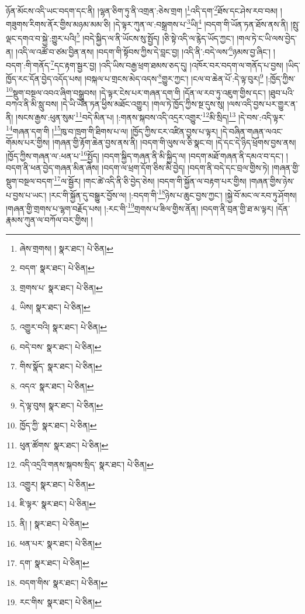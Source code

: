 ཉོན་མོངས་འདི་ཡང་བདག་དང་ནི། །ལྷན་ཅིག་ཏུ་ནི་འགྲན་:ཅེས་གྲག །\footnote{ཞེས་གྲགས། །  སྣར་ཐང་།  པེ་ཅིན། }འདི་དག་\footnote{བདག་  སྣར་ཐང་།  པེ་ཅིན། }ཐོས་དང་ཤེས་རབ་བམ། །གཟུགས་རིགས་ནོར་གྱིས་མཉམ་མམ་ཅི། །དེ་ལྟར་ཀུན་ལ་:བསྒྲགས་པ་\footnote{གྲགས་པ་  སྣར་ཐང་།  པེ་ཅིན། }ཡི།\footnote{ཡིས།  སྣར་ཐང་།  པེ་ཅིན། } །བདག་གི་ཡོན་ཏན་ཐོས་ནས་ནི། །སྤུ་ལྡང་དགའ་བ་སྐྱེ་:གྱུར་པའི།\footnote{འགྱུར་བའི།  སྣར་ཐང་།  པེ་ཅིན། } །བདེ་སྐྱིད་ལ་ནི་ཡོངས་སུ་སྤྱོད། །ཅི་སྟེ་འདི་ལ་རྙེད་ཡོད་ཀྱང་། །གལ་ཏེ་ང་ཡི་ལས་བྱེད་ན། །འདི་ལ་འཚོ་བ་ཙམ་བྱིན་ནས། །བདག་གི་སྟོབས་ཀྱིས་དེ་བླང་བྱ། །འདི་ནི་:བདེ་ལས་\footnote{བདེ་བས་  སྣར་ཐང་།  པེ་ཅིན། }ཉམས་བྱ་ཞིང་། །བདག་:གི་གནོད་\footnote{གིས་སྣོད་  སྣར་ཐང་།  པེ་ཅིན། }དང་རྟག་སྦྱར་བྱ། །འདི་ཡིས་བརྒྱ་ཕྲག་ཐམས་ཅད་དུ། །འཁོར་བར་བདག་ལ་གནོད་པ་བྱས། །ཡིད་ཁྱོད་རང་དོན་བྱེད་འདོད་པས། །བསྐལ་པ་གྲངས་མེད་འདས་\footnote{འདའ་  སྣར་ཐང་།  པེ་ཅིན། }གྱུར་ཀྱང་། །ངལ་བ་ཆེན་པོ་:དེ་ལྟ་བུར།\footnote{དེ་ལྟ་བུས།  སྣར་ཐང་།  པེ་ཅིན། } །:ཁྱོད་ཀྱིས་\footnote{ཁྱོད་ཀྱི་  སྣར་ཐང་།  པེ་ཅིན། }སྡུག་བསྔལ་འབའ་ཞིག་བསྒྲུབས། །དེ་ལྟར་ངེས་པར་གཞན་དག་གི །དོན་ལ་རབ་ཏུ་འཇུག་གྱིས་དང་། །ཐུབ་པའི་བཀའ་ནི་མི་སླུ་བས། །དེ་ཡི་ཡོན་ཏན་ཕྱིས་མཐོང་འགྱུར། །གལ་ཏེ་ཁྱོད་ཀྱིས་སྔ་དུས་སུ། །ལས་འདི་བྱས་པར་གྱུར་ན་ནི། །སངས་རྒྱས་:ཕུན་སུམ་\footnote{ཕུན་ཚོགས་  སྣར་ཐང་།  པེ་ཅིན། }བདེ་མིན་པ། །:གནས་སྐབས་འདི་འདྲར་འགྱུར་\footnote{འདི་འདྲའི་གནས་སྐབས་སྲིད་  སྣར་ཐང་།  པེ་ཅིན། }མི་སྲིད།\footnote{འགྱུར།  སྣར་ཐང་།  པེ་ཅིན། } །དེ་བས་:འདི་ལྟར་\footnote{ཇི་ལྟར་  སྣར་ཐང་།  པེ་ཅིན། }གཞན་དག་གི །\footnote{ནི། །  སྣར་ཐང་།  པེ་ཅིན། }ཁུ་བ་ཁྲག་གི་ཐིགས་པ་ལ། །ཁྱོད་ཀྱིས་ངར་འཛིན་བྱས་པ་ལྟར། །དེ་བཞིན་གཞན་ལའང་གོམས་པར་གྱིས། །གཞན་གྱི་རྟོག་ཆེན་བྱས་ནས་ནི། །བདག་གི་ལུས་ལ་ཅི་སྣང་བ། །དེ་དང་དེ་ཉིད་ཕྲོགས་བྱས་ནས། །ཁྱོད་ཀྱིས་གཞན་ལ་:ཕན་པ་\footnote{ཕན་པར་  སྣར་ཐང་།  པེ་ཅིན། }སྤྱོད། །བདག་སྐྱིད་གཞན་ནི་མི་སྐྱིད་ལ། །བདག་མཐོ་གཞན་ནི་དམའ་བ་དང་། །བདག་ནི་ཕན་བྱེད་གཞན་མིན་ཞེས། །བདག་ལ་ཕྲག་དོག་ཅིས་མི་བྱེད། །བདག་ནི་བདེ་དང་བྲལ་གྱིས་ཏེ། །གཞན་གྱི་སྡུག་བསྔལ་བདག་\footnote{དག་  སྣར་ཐང་།  པེ་ཅིན། }ལ་སྦྱོར། །གང་ཚེ་འདི་ནི་ཅི་བྱེད་ཅེས། །བདག་གི་སྐྱོན་ལ་བརྟག་པར་གྱིས། །གཞན་གྱིས་ཉེས་པ་བྱས་པ་ཡང་། །རང་གི་སྐྱོན་དུ་བསྒྱུར་བྱོས་ལ། །:བདག་གི་\footnote{བདག་གིས་  སྣར་ཐང་།  པེ་ཅིན། }ཉེས་པ་ཆུང་བྱས་ཀྱང་། །སྐྱེ་བོ་མང་ལ་རབ་ཏུ་ཤོགས། །གཞན་གྱི་གྲགས་པ་ལྷག་བརྗོད་པས། །:རང་གི་\footnote{རང་གིས་  སྣར་ཐང་།  པེ་ཅིན། }གྲགས་པ་ཟིལ་གྱིས་ནོན། །བདག་ནི་བྲན་གྱི་ཐ་མ་ལྟར། །དོན་རྣམས་ཀུན་ལ་བཀོལ་བར་གྱིས། །
